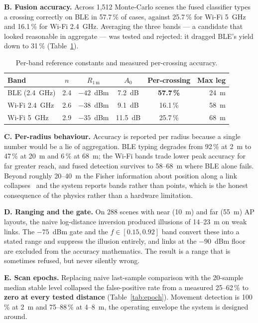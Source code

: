 \documentclass[journal,10pt]{IEEEtran}
\begin{document}
\textbf{B. Fusion accuracy.} Across 1,512 Monte-Carlo scenes the fused
classifier types a crossing correctly on BLE in 57.7\,\% of cases, against
25.7\,\% for Wi-Fi 5~GHz and 16.1\,\% for Wi-Fi 2.4~GHz. Averaging the three
bands --- a candidate that looked reasonable in aggregate --- was tested and
rejected: it dragged BLE's yield down to 31\,\% (Table~\ref{tab:bands}).

\begin{table}[t]
  \centering
  \caption{Per-band reference constants and measured per-crossing accuracy.}
  \label{tab:bands}
  \footnotesize
  \begin{tabular}{@{}lccccr@{}}
    \toprule
    Band & $n$ & $R_{1\,\mathrm{m}}$ & $A_0$ & Per-crossing & Max leg \\
    \midrule
    BLE (2.4~GHz) & 2.4 & $-42$~dBm & 7.2~dB & \textbf{57.7\,\%} & 24~m \\
    Wi-Fi 2.4~GHz & 2.6 & $-38$~dBm & 9.1~dB & 16.1\,\% & 58~m \\
    Wi-Fi 5~GHz & 2.9 & $-35$~dBm & 11.5~dB & 25.7\,\% & 68~m \\
    \bottomrule
  \end{tabular}
\end{table}

\textbf{C. Per-radius behaviour.} Accuracy is reported per radius because a
single number would be a lie of aggregation. BLE typing degrades from 92\,\% at
2~m to 47\,\% at 20~m and 6\,\% at 68~m; the Wi-Fi bands trade lower peak
accuracy for far greater reach, and fused detection survives to 58--68~m where
BLE alone fails. Beyond roughly 20--40~m the Fisher information about position
along a link collapses~\cite{li2024} and the system reports bands rather than
points, which is the honest consequence of the physics rather than a hardware
limitation.

\textbf{D. Ranging and the gate.} On 288 scenes with near (10~m) and far
(55~m) AP layouts, the naive log-distance inversion produced illusions of
14--23~m on weak links. The $-75$~dBm gate and the $f \in [0.15, 0.92]$ band
convert these into a stated range and suppress the illusion entirely, and links
at the $-90$~dBm floor are excluded from the accuracy mathematics. The result is
a range that is sometimes refused, but never silently wrong.

\textbf{E. Scan epochs.} Replacing naive last-sample comparison with the
20-sample median stable level collapsed the false-positive rate from a measured
25--62\,\% to \textbf{zero at every tested distance}
(Table~\ref{tab:epoch}). Movement detection is 100\,\% at 2~m and 75--88\,\% at
4--8~m, the operating envelope the system is designed around.
\end{document}
